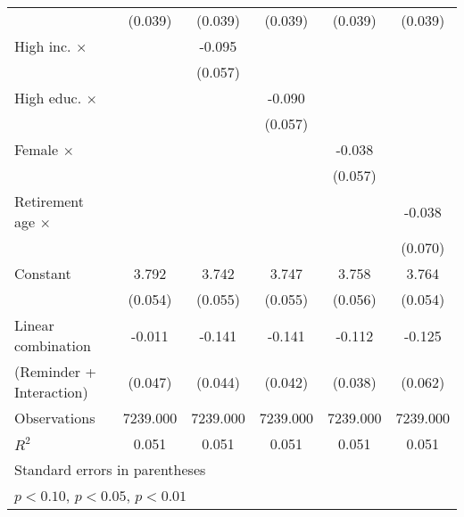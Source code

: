 {\begin{tabular}{l*{5}{c}}
                    &     (0.039)         &     (0.039)         &     (0.039)         &     (0.039)         &     (0.039)         \\
\addlinespace
High inc. $\times$  &                     &      -0.095\sym{*}  &                     &                     &                     \\
                    &                     &     (0.057)         &                     &                     &                     \\
\addlinespace
High educ. $\times$ &                     &                     &      -0.090         &                     &                     \\
                    &                     &                     &     (0.057)         &                     &                     \\
\addlinespace
Female $\times$     &                     &                     &                     &      -0.038         &                     \\
                    &                     &                     &                     &     (0.057)         &                     \\
\addlinespace
Retirement age $\times$&                     &                     &                     &                     &      -0.038         \\
                    &                     &                     &                     &                     &     (0.070)         \\
\addlinespace
Constant            &       3.792\sym{***}&       3.742\sym{***}&       3.747\sym{***}&       3.758\sym{***}&       3.764\sym{***}\\
                    &     (0.054)         &     (0.055)         &     (0.055)         &     (0.056)         &     (0.054)         \\
\midrule
Linear combination  &      -0.011         &      -0.141         &      -0.141         &      -0.112         &      -0.125         \\
(Reminder + Interaction)&     (0.047)         &     (0.044)         &     (0.042)         &     (0.038)         &     (0.062)         \\
Observations        &    7239.000         &    7239.000         &    7239.000         &    7239.000         &    7239.000         \\
\(R^{2}\)           &       0.051         &       0.051         &       0.051         &       0.051         &       0.051         \\
\bottomrule
\multicolumn{6}{l}{\footnotesize Standard errors in parentheses}\\
\multicolumn{6}{l}{\footnotesize \sym{*} \(p<0.10\), \sym{**} \(p<0.05\), \sym{***} \(p<0.01\)}\\
\end{tabular}
}
